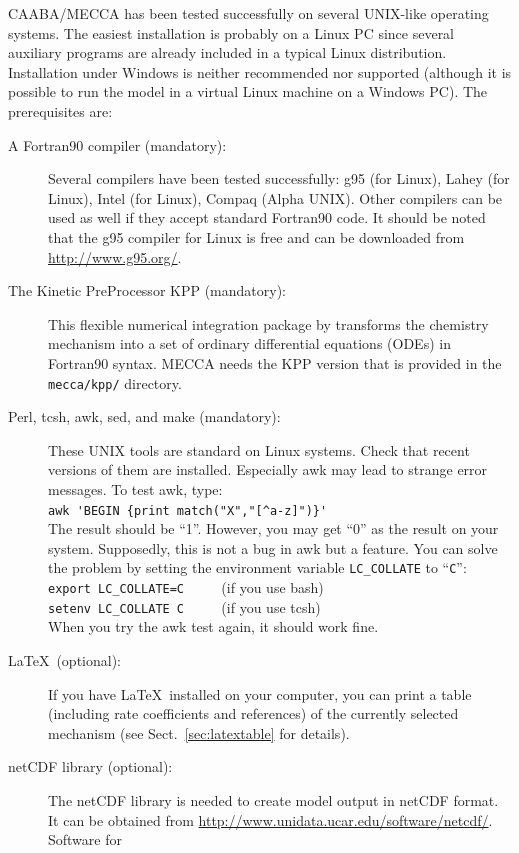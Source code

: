 \documentclass[twoside]{article}
\begin{document}
CAABA/MECCA has been tested successfully on several UNIX-like operating
systems. The easiest installation is probably on a Linux PC since
several auxiliary programs are already included in a typical Linux
distribution. Installation under Windows is neither recommended nor
supported (although it is possible to run the model in a virtual Linux
machine on a Windows PC). The prerequisites are:
\begin{description}
\item[A Fortran90 compiler (mandatory):] Several compilers have been
  tested successfully: g95 (for Linux), Lahey (for Linux), Intel (for
  Linux), Compaq (Alpha UNIX). Other compilers can be used as well if
  they accept standard Fortran90 code. It should be noted that the g95
  compiler for Linux is free and can be downloaded from
  \url{http://www.g95.org/}.
\item[The Kinetic PreProcessor KPP (mandatory):] This flexible numerical
  integration package by \citet{1665} transforms the chemistry mechanism
  into a set of ordinary differential equations (ODEs) in Fortran90
  syntax. MECCA needs the KPP version that is provided in the
  \verb|mecca/kpp/| directory.
\item[Perl, tcsh, awk, sed, and make (mandatory):] These UNIX tools are
  standard on Linux systems. Check that recent versions of them are
  installed. Especially awk may lead to strange error messages.
  To test awk, type:\\
  \verb|awk 'BEGIN {print match("X","[^a-z]")}'|\\
  The result should be ``1''. However, you may get ``0'' as the result
  on your system. Supposedly, this is not a bug in awk but a feature.
  You can solve the problem by setting the environment variable
  \verb|LC_COLLATE| to ``\verb|C|'':\\
  \verb|export LC_COLLATE=C| $\qquad$ (if you use bash)\\
  \verb|setenv LC_COLLATE C| $\qquad$ (if you use tcsh)\\
  When you try the awk test again, it should work fine.
\item[La\TeX\ (optional):] If you have La\TeX\ installed on your
  computer, you can print a table (including rate coefficients and
  references) of the currently selected mechanism (see
  Sect.~\ref{sec:latextable} for details).
\item[netCDF library (optional):] The netCDF library is needed to create
  model output in netCDF format. It can be obtained from
  \url{http://www.unidata.ucar.edu/software/netcdf/}. Software for

\end{description}
\end{document}
